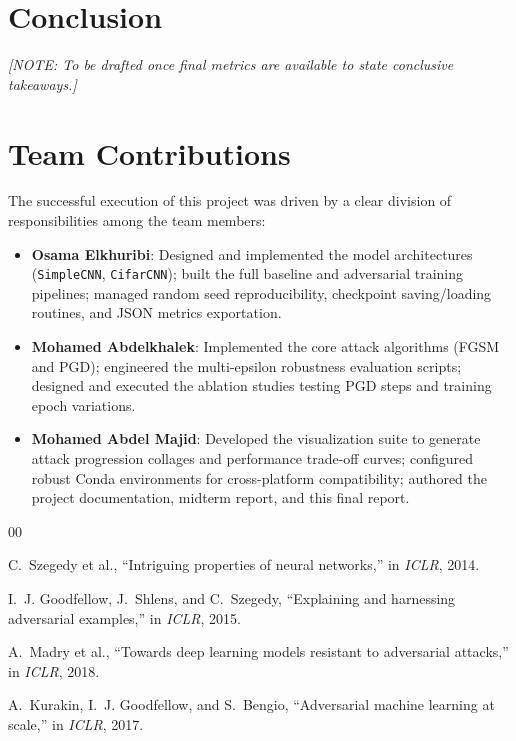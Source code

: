 \documentclass[conference,10pt]{IEEEtran}
\begin{document}
\section{Conclusion}
\textit{[NOTE: To be drafted once final metrics are available to state conclusive takeaways.]}


\section{Team Contributions}

The successful execution of this project was driven by a clear division of responsibilities among the team members:

\begin{itemize}
    \item \textbf{Osama Elkhuribi}: Designed and implemented the model architectures (\texttt{SimpleCNN}, \texttt{CifarCNN}); built the full baseline and adversarial training pipelines; managed random seed reproducibility, checkpoint saving/loading routines, and JSON metrics exportation.
    \item \textbf{Mohamed Abdelkhalek}: Implemented the core attack algorithms (FGSM and PGD); engineered the multi-epsilon robustness evaluation scripts; designed and executed the ablation studies testing PGD steps and training epoch variations.
    \item \textbf{Mohamed Abdel Majid}: Developed the visualization suite to generate attack progression collages and performance trade-off curves; configured robust Conda environments for cross-platform compatibility; authored the project documentation, midterm report, and this final report.
\end{itemize}


\begin{thebibliography}{00}

C.~Szegedy et al., ``Intriguing properties of neural networks,'' in \textit{ICLR}, 2014.

I.~J. Goodfellow, J.~Shlens, and C.~Szegedy, ``Explaining and harnessing adversarial examples,'' in \textit{ICLR}, 2015.

A.~Madry et al., ``Towards deep learning models resistant to adversarial attacks,'' in \textit{ICLR}, 2018.

A.~Kurakin, I.~J. Goodfellow, and S.~Bengio, ``Adversarial machine learning at scale,'' in \textit{ICLR}, 2017.

\end{thebibliography}
\end{document}
